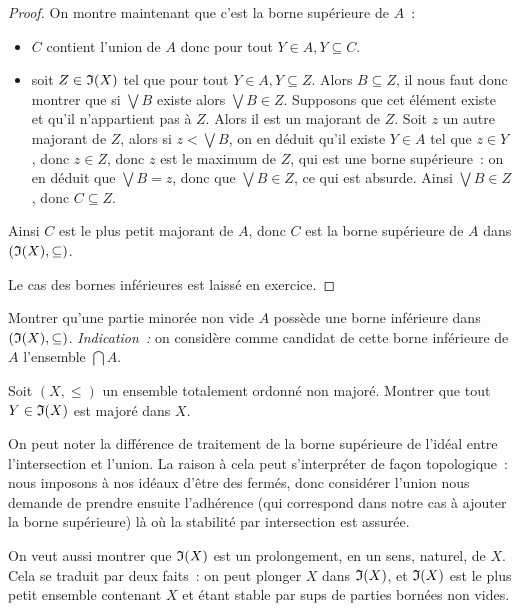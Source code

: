 \begin{proof}
  On montre maintenant que c'est la borne supérieure de $A$~:
  \begin{itemize}
  \item $C$ contient l'union de $A$ donc pour tout $Y\in A, Y\subseteq C$.
  \item soit $Z\in\mathfrak{I}(X)$ tel que pour tout $Y\in A, Y\subseteq Z$. Alors
    $B\subseteq Z$, il nous faut donc montrer que si $\bigvee B$ existe alors
    $\bigvee B \in Z$. Supposons que cet élément existe et qu'il n'appartient
    pas à $Z$. Alors il est un majorant de $Z$. Soit $z$ un autre majorant de
    $Z$, alors si $z < \bigvee B$, on en déduit qu'il existe $Y\in A$ tel que
    $z\in Y$, donc $z \in Z$, donc $z$ est le maximum de $Z$, qui est une borne
    supérieure~: on en déduit que $\bigvee B = z$, donc que $\bigvee B \in Z$,
    ce qui est absurde. Ainsi $\bigvee B \in Z$, donc $C\subseteq Z$.
  \end{itemize}
  Ainsi $C$ est le plus petit majorant de $A$, donc $C$ est la borne supérieure
  de $A$ dans $(\mathfrak{I}(X),\subseteq)$.

  Le cas des bornes inférieures est laissé en exercice.
\end{proof}

\begin{exercise}
  Montrer qu'une partie minorée non vide $A$ possède une borne inférieure dans
  $(\mathfrak{I}(X),\subseteq)$. \textit{Indication~:} on considère comme candidat de
  cette borne inférieure de $A$ l'ensemble $\bigcap A$.
\end{exercise}

\begin{exercise}\label{exo.ide.maj}
  Soit $(X,\leq)$ un ensemble totalement ordonné non majoré. Montrer que tout
  $Y \in \mathfrak{I}(X)$ est majoré dans $X$.
\end{exercise}

\begin{remark}
  On peut noter la différence de traitement de la borne supérieure de l'idéal
  entre l'intersection et l'union. La raison à cela peut s'interpréter de façon
  topologique~: nous imposons à nos idéaux d'être des fermés, donc considérer
  l'union nous demande de prendre ensuite l'adhérence (qui correspond dans notre
  cas à ajouter la borne supérieure) là où la stabilité par intersection est
  assurée.
\end{remark}

On veut aussi montrer que $\mathfrak{I}(X)$ est un prolongement, en un sens, naturel,
de $X$. Cela se traduit par deux faits~: on peut plonger $X$ dans $\mathfrak{I}(X)$,
et $\mathfrak{I}(X)$ est le plus petit ensemble contenant $X$ et étant stable par
sups de parties bornées non vides.

